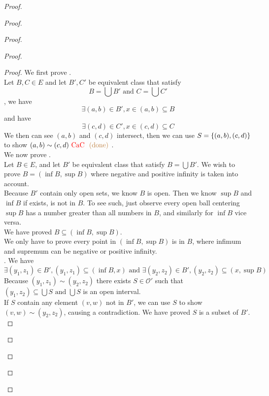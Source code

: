 \documentclass{report}
\begin{document}
\begin{proof}
\begin{proof}
\begin{proof}
\begin{proof}
\begin{proof}
We first prove .\\

Let $B,C\in E$ and let $B',C'$ be equivalent class that satisfy
\begin{equation}
B=\bigcup B'\text{ and }C=\bigcup C'
\end{equation}
, we have
\begin{equation}
\exists (a,b)\in B', x\in (a,b)\subseteq B
\end{equation}
and have
\begin{equation}
\exists (c,d)\in C',x \in (c,d)\subseteq C
\end{equation}
We then can see $(a,b)$ and $(c,d)$ intersect, then we can use $S=\{ (a,b),(c,d) \}$ to show $(a,b)\sim (c,d)\text{ \textcolor{red}{CaC} }\textcolor{brown}{\text{ (done) }}$.\\

We now prove  .\\
 
Let $B\in E$, and let $B'$ be equivalent class that satisfy  $B=\bigcup B'$. We wish to prove $B=(\inf B,\sup B)$ where negative and positive infinity is taken into account.\\

Because $B'$ contain only open sets, we know  $B$ is open. Then we know $\sup  B$ and $\inf B$ if exists, is not in $B$. To see such, just observe every open ball centering $\sup B$ has a number greater than all numbers in $B$, and similarly for $\inf B$ vice versa.\\

We have proved $B\subseteq (\inf B,\sup B)$.\\

We only have to prove every point in $(\inf B,\sup  B)$ is in $B$, where infimum and supremum can be negative or positive infinity.\\

. We have
\begin{equation}
\exists (y_1,z_1)\in B', (y_1,z_1)\subseteq (\inf B,x)\text{ and }\exists (y_2,z_2)\in B', (y_2,z_2)\subseteq (x,\sup B)
\end{equation}
Because $(y_1,z_1)\sim (y_2,z_2)$ there exists $S\in \mathcal{O}'$ such that $(y_1,z_2)\subseteq \bigcup S\text{ and }\bigcup S$ is an open interval.\\

If $S$ contain any element  $(v,w)$ not in $B'$, we can use  $S$ to show  $(v,w)\sim (y_2,z_2)$, causing a contradiction. We have proved $S$ is a subset of  $B'$.\\


\end{proof}
\end{proof}
\end{proof}
\end{proof}
\end{proof}
\end{document}
